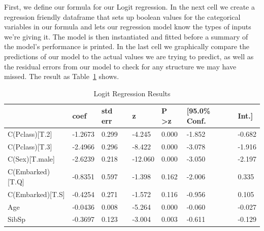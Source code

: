 \documentclass{article}
\begin{document}
First, we define our formula for our Logit regression. In the next cell we create a regression friendly dataframe that sets up boolean values for the categorical variables in our formula and lets our regression model know the types of inputs we're giving it. The model is then instantiated and fitted before a summary of the model's performance is printed. In the last cell we graphically compare the predictions of our model to the actual values we are trying to predict, as well as the residual errors from our model to check for any structure we may have missed. The result as Table~\ref{tab:logit} shows.


\begin{table}[h]
  \caption{Logit Regression Results}
\begin{tabular}{| l | l | l | l | l | l | l |}
  \hline
   & coef & std err & z & P \textgreater z & [95.0\% Conf. & Int.] \\
   \hline
C(Pclass)[T.2]    &  -1.2673    &  0.299   &  -4.245    &  0.000     &   -1.852  &  -0.682 \\
  \hline
C(Pclass)[T.3]    &  -2.4966    &  0.296   &  -8.422    &  0.000     &   -3.078  &  -1.916 \\
  \hline
C(Sex)[T.male]    &  -2.6239    &  0.218   & -12.060    &  0.000     &   -3.050  &  -2.197 \\
  \hline
C(Embarked)[T.Q]  &  -0.8351    &  0.597   &  -1.398    &  0.162     &   -2.006  &   0.335 \\
  \hline
C(Embarked)[T.S]  &  -0.4254    &  0.271   &  -1.572    &  0.116     &   -0.956  &   0.105 \\
  \hline
Age               &  -0.0436    &  0.008   &  -5.264    &  0.000     &   -0.060  &  -0.027 \\
  \hline
SibSp             &  -0.3697    &  0.123   &  -3.004    &  0.003     &   -0.611  &  -0.129 \\
  \hline

\end{tabular}
\label {tab:logit}
\end{table}
\end{document}
